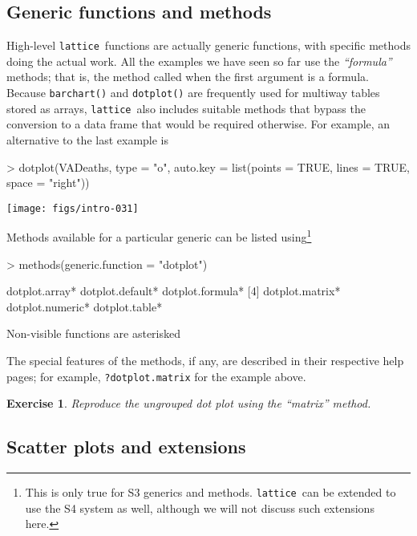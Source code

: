 \documentclass[10pt]{article}
\newcommand{\code}[1]{\texttt{#1}}
\newcommand{\lattice}{\code{lattice}}
\newcommand{\Rfunction}[1]{\code{#1()}}
\newcommand{\class}[1]{\textit{``#1''}}
\newtheorem{exercise}{Exercise}
\begin{document}
\newpage

\subsection*{Generic functions and methods}

High-level \lattice\ functions are actually generic functions, with
specific methods doing the actual work.  All the examples we have seen
so far use the \class{formula} methods; that is, the method called
when the first argument is a formula.  Because \Rfunction{barchart}
and \Rfunction{dotplot} are frequently used for multiway tables stored
as arrays, \lattice\ also includes suitable methods that bypass the
conversion to a data frame that would be required otherwise.  For
example, an alternative to the last example is
\begin{Schunk}
\begin{Sinput}
> dotplot(VADeaths, type = "o",
          auto.key = list(points = TRUE, lines = TRUE, space = "right"))
\end{Sinput}
\end{Schunk}
\begin{center}
\texttt{[image: figs/intro-031]}
\end{center}
Methods available for a particular generic can be listed
using\footnote{This is only true for \textsf{S3} generics and methods.
  \lattice\ can be extended to use the \textsf{S4} system as well,
  although we will not discuss such extensions here.  }
\begin{Schunk}
\begin{Sinput}
> methods(generic.function = "dotplot")
\end{Sinput}
\begin{Soutput}
[1] dotplot.array*   dotplot.default* dotplot.formula*
[4] dotplot.matrix*  dotplot.numeric* dotplot.table*  

   Non-visible functions are asterisked
\end{Soutput}
\end{Schunk}
%
The special features of the methods, if any, are described in their
respective help pages; for example, \code{?dotplot.matrix} for the
example above.
\begin{exercise}
  Reproduce the ungrouped dot plot using the \class{matrix} method.
\end{exercise}

\newpage

\subsection*{Scatter plots and extensions}
\end{document}
